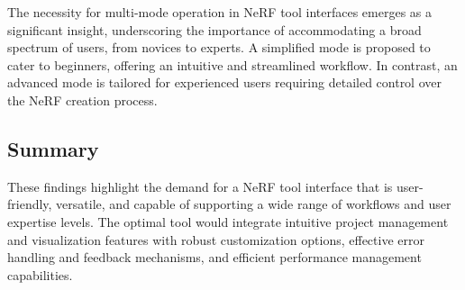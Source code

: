 The necessity for multi-mode operation in NeRF tool interfaces emerges as a significant insight, underscoring the importance of accommodating a broad spectrum of users, from novices to experts. 
A simplified mode is proposed to cater to beginners, offering an intuitive and streamlined workflow.
In contrast, an advanced mode is tailored for experienced users requiring detailed control over the NeRF creation process. 
\cite{P1, P2, P3, P4}


\subsection*{Summary}

These findings highlight the demand for a NeRF tool interface that is user-friendly, versatile, and capable of supporting a wide range of workflows and user expertise levels. 
The optimal tool would integrate intuitive project management and visualization features with robust customization options, effective error handling and feedback mechanisms, and efficient performance management capabilities.